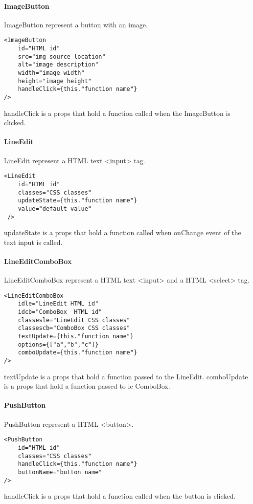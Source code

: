 \begin{flushleft}
    \paragraph{ImageButton}
ImageButton represent a button with an image.
\begin{verbatim}
<ImageButton
    id="HTML id"
    src="img source location"
    alt="image description"
    width="image width"
    height="image height"
    handleClick={this."function name"}
/>
\end{verbatim}
handleClick is a props that hold a function called when the ImageButton is clicked.

    \paragraph{LineEdit}
LineEdit represent a HTML text <input> tag.
\begin{verbatim}
<LineEdit
    id="HTML id"
    classes="CSS classes"
    updateState={this."function name"}
    value="default value"
 />
\end{verbatim}
updateState is a props that hold a function called when onChange event of the text input is called.

    \paragraph{LineEditComboBox}
LineEditComboBox represent a HTML text <input> and a HTML <select> tag.
\begin{verbatim}
<LineEditComboBox
    idle="LineEdit HTML id"
    idcb="ComboBox  HTML id"
    classesle="LineEdit CSS classes"
    classescb="ComboBox CSS classes"
    textUpdate={this."function name"}
    options={["a","b","c"]}
    comboUpdate={this."function name"}
/>
\end{verbatim}
textUpdate is a props that hold a function passed to the LineEdit.
comboUpdate is a props that hold a function passed to le ComboBox.

    \paragraph{PushButton}
PushButton represent a HTML <button>.
\begin{verbatim}
<PushButton
    id="HTML id"
    classes="CSS classes"
    handleClick={this."function name"}
    buttonName="button name"
/>
\end{verbatim}
handleClick is a props that hold a function called when the button is clicked.


\end{flushleft}
